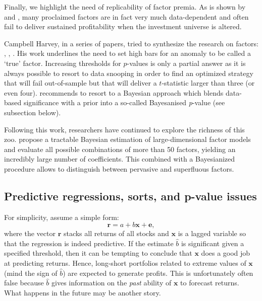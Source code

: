 \documentclass[]{krantz}
\theoremstyle{definition}
\theoremstyle{definition}
\theoremstyle{definition}
\theoremstyle{remark}
\begin{document}
Finally, we highlight the need of replicability of factor premia. As is
shown by \citet{linnainmaa2018history} and \citet{hou2019replicating},
many proclaimed factors are in fact very much data-dependent and often
fail to deliver sustained profitability when the investment universe is
altered.

Campbell Harvey, in a series of papers, tried to synthesize the research
on factors: \citet{harvey2016and}, \citet{harvey2017lucky},
\citet{harvey2019census}. His work underlines the need to set high bars
for an anomaly to be called a `true' factor. Increasing thresholds for
\(p\)-values is only a partial answer as it is always possible to resort
to data snooping in order to find an optimized strategy that will fail
out-of-sample but that will deliver a \(t\)-statistic larger than three
(or even four). \citet{harvey2017presidential} recommends to resort to a
Bayesian approach which blends data-based significance with a prior into
a so-called Bayesanised \emph{p}-value (see subsection below).

Following this work, researchers have continued to explore the richness
of this zoo. \citet{bryzgalova2019bayesian} propose a tractable Bayesian
estimation of large-dimensional factor models and evaluate all possible
combinations of more than 50 factors, yielding an incredibly large
number of coefficients. This combined with a Bayesianized
\citet{fama1973risk} procedure allows to distinguish between pervasive
and superfluous factors.

\hypertarget{predictive-regressions-sorts-and-p-value-issues}{%
\subsection{Predictive regressions, sorts, and p-value
issues}\label{predictive-regressions-sorts-and-p-value-issues}}

For simplicity, assume a simple form: \begin{equation}
\label{eq:factsimple}
\textbf{r} = a+b\textbf{x}+\textbf{e},
\end{equation} where the vector \(\textbf{r}\) stacks all returns of all
stocks and \(\textbf{x}\) is a lagged variable so that the regression is
indeed predictive. If the estimate \(\hat{b}\) is significant given a
specified threshold, then it can be tempting to conclude that
\(\textbf{x}\) does a good job at predicting returns. Hence, long-short
portfolios related to extreme values of \(\textbf{x}\) (mind the sign of
\(\hat{b}\)) are expected to generate profits. This is unfortunately
often false because \(\hat{b}\) gives information on the \emph{past}
ability of \(\textbf{x}\) to forecast returns. What happens in the
future may be another story.
\end{document}
